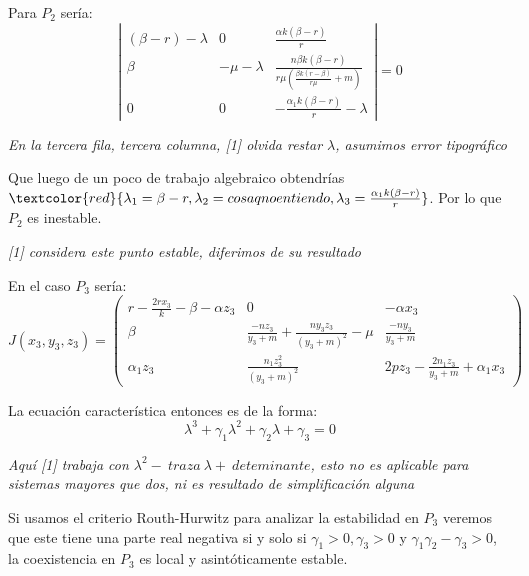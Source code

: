 \documentclass{wscpaperproc}
\theoremstyle{wsc}
\begin{document}
\vspace*{0.5cm}

Para $P_2$ sería:
$$\left|
	\begin{array}{ccc}
		(\beta-r)-\lambda & 0            & \frac{\alpha k(\beta-r)}{r}                                      \\
		\beta             & -\mu-\lambda & \frac{n\beta k(\beta-r)}{r\mu (\frac{\beta k(r-\beta)}{r\mu}+m)} \\
		0                 & 0            & -\frac{\alpha_1 k(\beta-r)}{r}-\lambda
	\end{array}
	\right| =0$$

{\it En la tercera fila, tercera columna, [1] olvida restar $\lambda$, asumimos error tipográfico}

Que luego de un poco de trabajo algebraico obtendrías $\textcolor{red}{\lambda_1=\beta-r, \lambda_2=cosa q no entiendo, \lambda_3=\frac{\alpha_1 k(\beta-r)}{r}}$. Por lo que $P_2$ es inestable.

	{\it [1] considera este punto estable, diferimos de su resultado}


\vspace*{0.5cm}

En el caso $P_3$ sería:
$$ J(x_3, y_3, z_3) = \left(
	\begin{array}{ccc}
			r-\frac{2rx_3}{k}-\beta-\alpha z_3 & 0                                                 & -\alpha x_3                             \\
			\beta                              & \frac{-nz_3}{y_3+m}+\frac{ny_3z_3}{(y_3+m)^2}-\mu & \frac{-ny_3}{y_3+m}                     \\
			\alpha_1z_3                        & \frac{n_1z_3^2}{(y_3+m)^2}                        & 2pz_3-\frac{2n_1z_3}{y_3+m}+\alpha_1x_3
		\end{array}
	\right)$$

La ecuación característica entonces es de la forma:
$$\lambda^3+\gamma_1\lambda^2+\gamma_2\lambda+\gamma_3=0 $$

{\it Aquí [1] trabaja con $\lambda^2-\ traza\ \lambda+\ deteminante$, esto no es aplicable para sistemas mayores que dos, ni
es resultado de simplificación alguna}

Si usamos el criterio Routh-Hurwitz para analizar la estabilidad en $P_3$ veremos que este
tiene una parte real negativa si y solo si $\gamma_1>0, \gamma_3>0$ y $\gamma_1\gamma_2-\gamma_3>0$, la coexistencia en $P_3$ es local
y asintóticamente estable.

\vspace*{3cm}
\end{document}
